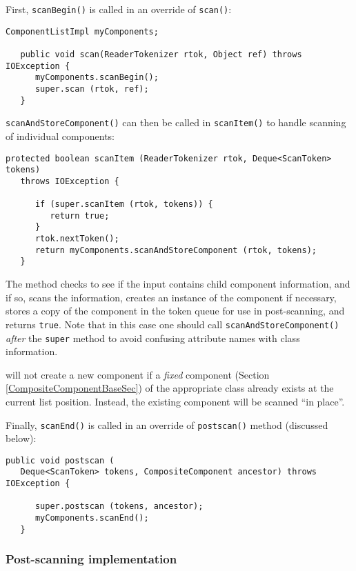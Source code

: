 \documentclass{article}
\begin{document}
First, {\tt scanBegin()} is called in an override of {\tt scan()}:
\begin{lstlisting}[]
   ComponentListImpl myComponents; 

   public void scan(ReaderTokenizer rtok, Object ref) throws IOException {
      myComponents.scanBegin();
      super.scan (rtok, ref);
   }
\end{lstlisting}

{\tt scanAndStoreComponent()} can then be called in {\tt scanItem()} to
handle scanning of individual components:
\begin{lstlisting}[]
   protected boolean scanItem (ReaderTokenizer rtok, Deque<ScanToken> tokens)
   throws IOException {

      if (super.scanItem (rtok, tokens)) {
         return true;
      }
      rtok.nextToken();
      return myComponents.scanAndStoreComponent (rtok, tokens);
   }
\end{lstlisting}
The method checks to see if the input contains child component
information, and if so, scans the information, creates an instance of
the component if necessary, stores a copy of the component
in the token queue for use in post-scanning, and returns 
{\tt true}.
Note that in this case one should call {\tt scanAndStoreComponent()} {\it after}
the {\tt super} method to avoid confusing attribute names with class
information.

\begin{sideblock}
will not create a new component if a {\it fixed} component (Section
\ref{CompositeComponentBaseSec}) of the appropriate class already
exists at the current list position. Instead, the existing component
will be scanned ``in place''.
\end{sideblock}

Finally, {\tt scanEnd()} is called in an override of {\tt postscan()}
method (discussed below):
\begin{lstlisting}[]
   public void postscan (
   Deque<ScanToken> tokens, CompositeComponent ancestor) throws IOException {

      super.postscan (tokens, ancestor);
      myComponents.scanEnd();
   }
\end{lstlisting}

\subsubsection{Post-scanning implementation}
\end{document}

